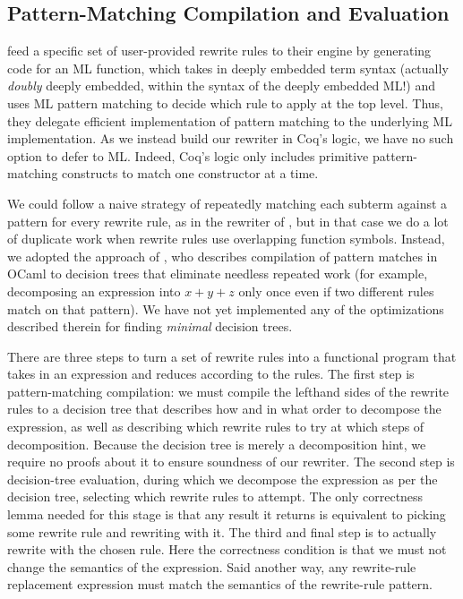 \documentclass[sigplan,10pt,review,anonymous]{acmart}\settopmatter{printfolios=true,printccs=false,printacmref=false}
\begin{document}
\subsection{Pattern-Matching Compilation and Evaluation} \label{sec:pattern-matching-compilation-and-evaluation}

\citet{Aehlig} feed a specific set of user-provided rewrite rules to their engine by generating code for an ML function, which takes in deeply embedded term syntax (actually \emph{doubly} deeply embedded, within the syntax of the deeply embedded ML!) and uses ML pattern matching to decide which rule to apply at the top level.
Thus, they delegate efficient implementation of pattern matching to the underlying ML implementation.
As we instead build our rewriter in Coq's logic, we have no such option to defer to ML.
Indeed, Coq's logic only includes primitive pattern-matching constructs to match one constructor at a time.

We could follow a naive strategy of repeatedly matching each subterm against a pattern for every rewrite rule, as in the rewriter of \citet{rtac}, but in that case we do a lot of duplicate work when rewrite rules use overlapping function symbols.
Instead, we adopted the approach of \citet{maranget2008compiling}, who describes compilation of pattern matches in OCaml to decision trees that eliminate needless repeated work (for example, decomposing an expression into $x + y + z$ only once even if two different rules match on that pattern).
We have not yet implemented any of the optimizations described therein for finding \emph{minimal} decision trees.

There are three steps to turn a set of rewrite rules into a functional program that takes in an expression and reduces according to the rules.
The first step is pattern-matching compilation: we must compile the lefthand sides of the rewrite rules to a decision tree that describes how and in what order to decompose the expression, as well as describing which rewrite rules to try at which steps of decomposition.
Because the decision tree is merely a decomposition hint, we require no proofs about it to ensure soundness of our rewriter.
The second step is decision-tree evaluation, during which we decompose the expression as per the decision tree, selecting which rewrite rules to attempt.
The only correctness lemma needed for this stage is that any result it returns is equivalent to picking some rewrite rule and rewriting with it.
The third and final step is to actually rewrite with the chosen rule.
Here the correctness condition is that we must not change the semantics of the expression.
Said another way, any rewrite-rule replacement expression must match the semantics of the rewrite-rule pattern.
\end{document}

